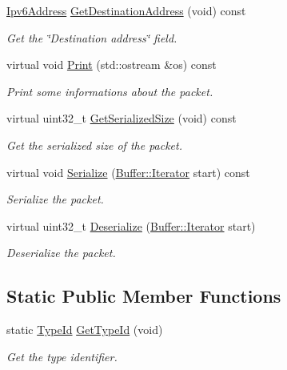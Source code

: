 \begin{DoxyCompactItemize}
\hyperlink{classns3_1_1Ipv6Address}{Ipv6\+Address} \hyperlink{classns3_1_1Ipv6Header_a472309d4a08c9fea54092346ba7beca4}{Get\+Destination\+Address} (void) const 
\begin{DoxyCompactList}\small\item\em Get the \char`\"{}\+Destination address\char`\"{} field. \end{DoxyCompactList}\item 
virtual void \hyperlink{classns3_1_1Ipv6Header_a894d672b9eec0cb20a721fb8b9d66038}{Print} (std\+::ostream \&os) const 
\begin{DoxyCompactList}\small\item\em Print some informations about the packet. \end{DoxyCompactList}\item 
virtual uint32\+\_\+t \hyperlink{classns3_1_1Ipv6Header_a4a0464cd471e0a3923470255af25ddeb}{Get\+Serialized\+Size} (void) const 
\begin{DoxyCompactList}\small\item\em Get the serialized size of the packet. \end{DoxyCompactList}\item 
virtual void \hyperlink{classns3_1_1Ipv6Header_a6c927edee07d668e0a5aba391c1af9b4}{Serialize} (\hyperlink{classns3_1_1Buffer_1_1Iterator}{Buffer\+::\+Iterator} start) const 
\begin{DoxyCompactList}\small\item\em Serialize the packet. \end{DoxyCompactList}\item 
virtual uint32\+\_\+t \hyperlink{classns3_1_1Ipv6Header_ad444d49877468f76bbc9ab1b50e9dd02}{Deserialize} (\hyperlink{classns3_1_1Buffer_1_1Iterator}{Buffer\+::\+Iterator} start)
\begin{DoxyCompactList}\small\item\em Deserialize the packet. \end{DoxyCompactList}\end{DoxyCompactItemize}
\subsection*{Static Public Member Functions}
\begin{DoxyCompactItemize}
\item 
static \hyperlink{classns3_1_1TypeId}{Type\+Id} \hyperlink{classns3_1_1Ipv6Header_a39a4e5424ee5f8f7e05914501e1e7d3d}{Get\+Type\+Id} (void)
\begin{DoxyCompactList}\small\item\em Get the type identifier. \end{DoxyCompactList}\end{DoxyCompactItemize}
